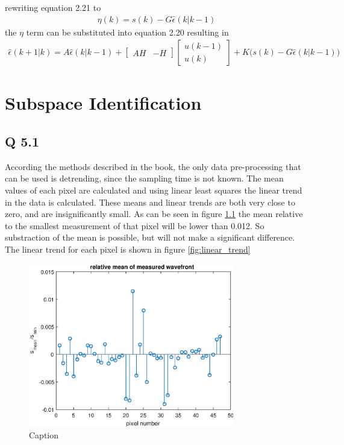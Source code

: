 \documentclass[11pt, oneside,a4paper,fleqn]{report}
\begin{document}
rewriting equation 2.21 to
\begin{align}
    \eta(k)=s(k)-G\hat{\epsilon}(k|k-1)
\end{align}
the $\eta$ term can be substituted into equation 2.20 resulting in
\begin{align}
    \hat{\epsilon}(k+1|k)=A\hat{\epsilon}(k|k-1) +
    \begin{bmatrix}
        AH & -H 
    \end{bmatrix}
    \begin{bmatrix}
        u(k-1)\\
        u(k)
    \end{bmatrix} +
    K\Big(s(k)-G\hat{\epsilon}(k|k-1)\Big)
\end{align}
\chapter{\bf Subspace Identification}
\section*{Q 5.1}
According the methods described in the book, the only data pre-processing that can be used is detrending, since the sampling time is not known. The mean values of each pixel are calculated and using linear least squares the linear trend in the data is calculated.
These means and linear trends are both very close to zero, and are insignificantly small. As can be seen in figure \ref{fig:rel_mean} the mean relative to the smallest measurement of that pixel will be lower than 0.012. So substraction of the mean is possible, but will not make a significant difference.
The linear trend for each pixel is shown in figure \ref{fig:linear_trend}

\begin{figure}[H]
    \centering
    \includegraphics[width=0.8\textwidth]{figures/relative_mean.eps}
    \caption{Caption}
    \label{fig:rel_mean}
\end{figure}
\end{document}
